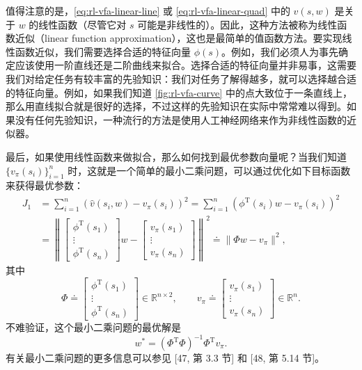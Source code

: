 值得注意的是，\cref{eq:rl-vfa-linear-line} 或 \cref{eq:rl-vfa-linear-quad} 中的 $\hat{v}(s,w)$ 是关于 $w$ 的线性函数（尽管它对 $s$ 可能是非线性的）。因此，这种方法被称为线性函数近似（linear function approximation），这也是最简单的值函数方法。要实现线性函数近似，我们需要选择合适的特征向量 $\phi(s)$。例如，我们必须人为事先确定应该使用一阶直线还是二阶曲线来拟合。选择合适的特征向量并非易事，这需要我们对给定任务有较丰富的先验知识：我们对任务了解得越多，就可以选择越合适的特征向量。例如，如果我们知道 \cref{fig:rl-vfa-curve} 中的点大致位于一条直线上，那么用直线拟合就是很好的选择，不过这样的先验知识在实际中常常难以得到。如果没有任何先验知识，一种流行的方法是使用人工神经网络来作为非线性函数的近似器。

最后，如果使用线性函数来做拟合，那么如何找到最优参数向量呢？当我们知道 $\{v_{\pi}(s_i)\}_{i=1}^n$ 时，这就是一个简单的最小二乘问题，可以通过优化如下目标函数来获得最优参数：
\begin{equation*}
\begin{aligned}
J_{1} &= \sum_{i=1}^{n} \left(\hat{v}(s_{i}, w) - v_{\pi}(s_{i})\right)^{2} = \sum_{i=1}^{n} \left(\phi^{\mathrm{T}}(s_{i}) w - v_{\pi}(s_{i})\right)^{2} \\
&= \left\| \left[\begin{array}{c} \phi^{\mathrm{T}}(s_{1}) \\ \vdots \\ \phi^{\mathrm{T}}(s_{n}) \end{array}\right] w - \left[\begin{array}{c} v_{\pi}(s_{1}) \\ \vdots \\ v_{\pi}(s_{n}) \end{array}\right] \right\|^{2} \doteq \| \Phi w - v_{\pi} \|^{2},
\end{aligned}
\end{equation*}
其中
\begin{equation*}
\Phi \doteq \left[\begin{array}{c} \phi^{\mathrm{T}}(s_{1}) \\ \vdots \\ \phi^{\mathrm{T}}(s_{n}) \end{array}\right] \in \mathbb{R}^{n \times 2}, \qquad v_{\pi} \doteq \left[\begin{array}{c} v_{\pi}(s_{1}) \\ \vdots \\ v_{\pi}(s_{n}) \end{array}\right] \in \mathbb{R}^{n}.
\end{equation*}
不难验证，这个最小二乘问题的最优解是
\begin{equation*}
w^{*} = (\Phi^{\mathrm{T}} \Phi)^{-1} \Phi^{\mathrm{T}} v_{\pi}.
\end{equation*}
有关最小二乘问题的更多信息可以参见 [47, 第 3.3 节] 和 [48, 第 5.14 节]。

